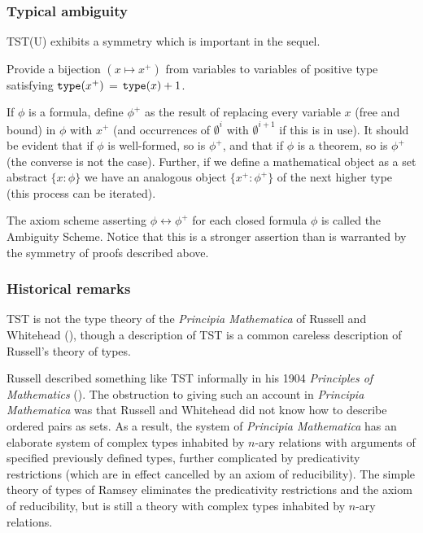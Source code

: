 \documentclass[112pt]{article}
\begin{document}
\subsubsection{Typical ambiguity}

TST(U) exhibits a symmetry which is important in the sequel.

Provide a bijection $(x \mapsto x^+)$ from variables to variables of positive type satisfying   ${\tt type}(x^+)$ = ${\tt type}(x)+1$.

If $\phi$ is a formula, define $\phi^+$ as the result of replacing every variable $x$ (free and bound) in $\phi$ with $x^+$ (and occurrences of $\emptyset^i$ with $\emptyset^{i+1}$ if this is in use).   It should be evident that if $\phi$ is well-formed, so is $\phi^+$,
and that if $\phi$ is a theorem, so is $\phi^+$ (the converse is not the case).  Further, if we define a mathematical object as a set abstract $\{x:\phi\}$ we have an analogous
object $\{x^+:\phi^+\}$ of the next higher type (this process can be iterated).

The axiom scheme asserting $\phi \leftrightarrow \phi^+$ for each closed formula $\phi$ is called the Ambiguity Scheme.   Notice that this is a stronger assertion than is warranted by the symmetry of proofs described above.

\subsubsection{Historical remarks}

TST is not the type theory of the {\em Principia Mathematica\/} of Russell and Whitehead (\cite{pm}), though a description of TST is a common careless description of Russell's theory of types.

Russell described something like TST informally in his 1904 {\em Principles of Mathematics\/} (\cite{pm1}).  The obstruction to giving such an account in {\em Principia Mathematica\/} was that
Russell and Whitehead did not know how to describe ordered pairs as sets.  As a result, the system of {\em Principia Mathematica\/} has an elaborate system of  complex
types inhabited by $n$-ary relations with arguments of specified previously defined types, further complicated by predicativity restrictions (which are in effect cancelled by an axiom of reducibility).
The simple theory of types of Ramsey eliminates the predicativity restrictions and the axiom of reducibility, but is still a theory with complex types inhabited by $n$-ary relations.
\end{document}
